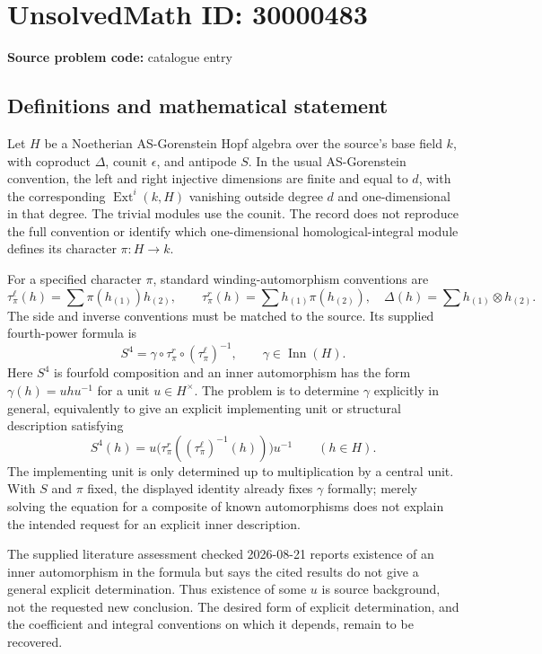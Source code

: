 \documentclass[11pt]{article}
\begin{document}
\section*{UnsolvedMath ID: 30000483}
\textbf{Source problem code:} catalogue entry
\subsection{Definitions and mathematical statement}
Let \(H\) be a Noetherian AS-Gorenstein Hopf algebra over the source's base field \(k\), with coproduct \(\Delta\), counit \(\epsilon\), and antipode \(S\). In the usual AS-Gorenstein convention, the left and right injective dimensions are finite and equal to \(d\), with the corresponding \(\operatorname{Ext}^i(k,H)\) vanishing outside degree \(d\) and one-dimensional in that degree. The trivial modules use the counit. The record does not reproduce the full convention or identify which one-dimensional homological-integral module defines its character \(\pi:H\to k\).

For a specified character \(\pi\), standard winding-automorphism conventions are
\[
\tau_\pi^\ell(h)=\sum\pi(h_{(1)})h_{(2)},\qquad
\tau_\pi^r(h)=\sum h_{(1)}\pi(h_{(2)}),
\quad\Delta(h)=\sum h_{(1)}\otimes h_{(2)}.
\]
The side and inverse conventions must be matched to the source. Its supplied fourth-power formula is
\[
S^4=\gamma\circ\tau_\pi^r\circ(\tau_\pi^\ell)^{-1},
\qquad\gamma\in\operatorname{Inn}(H).
\]
Here \(S^4\) is fourfold composition and an inner automorphism has the form \(\gamma(h)=uhu^{-1}\) for a unit \(u\in H^\times\). The problem is to determine \(\gamma\) explicitly in general, equivalently to give an explicit implementing unit or structural description satisfying
\[
S^4(h)=u\bigl(\tau_\pi^r((\tau_\pi^\ell)^{-1}(h))\bigr)u^{-1}\qquad(h\in H).
\]
The implementing unit is only determined up to multiplication by a central unit. With \(S\) and \(\pi\) fixed, the displayed identity already fixes \(\gamma\) formally; merely solving the equation for a composite of known automorphisms does not explain the intended request for an explicit inner description.

The supplied literature assessment checked 2026-08-21 reports existence of an inner automorphism in the formula but says the cited results do not give a general explicit determination. Thus existence of some \(u\) is source background, not the requested new conclusion. The desired form of explicit determination, and the coefficient and integral conventions on which it depends, remain to be recovered.
\end{document}
